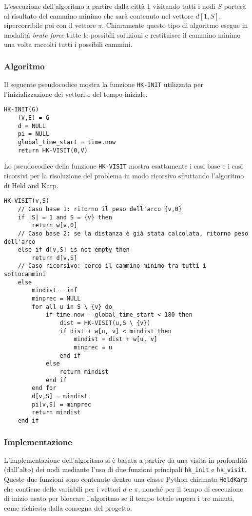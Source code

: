L'esecuzione dell'algoritmo a partire dalla città \(1\) visitando tutti i nodi \(S\) porterà al risultato del cammino minimo che sarà contenuto nel vettore \(d[1, S]\), ripercorribile poi con il vettore \(\pi\). Chiaramente questo tipo di algoritmo esegue in modalità \textit{brute force} tutte le possibili soluzioni e restituisce il cammino minimo una volta raccolti tutti i possibili cammini.

\subsubsection{Algoritmo}

Il seguente pseudocodice mostra la funzione \texttt{HK-INIT} utilizzata per l'inizializzazione dei vettori e del tempo iniziale. 
\begin{verbatim}
HK-INIT(G)
    (V,E) = G
    d = NULL
    pi = NULL
    global_time_start = time.now
    return HK-VISIT(0,V)
\end{verbatim}    

Lo pseudocodice della funzione \texttt{HK-VISIT} mostra esattamente i casi base e i casi ricorsivi per la risoluzione del problema in modo ricorsivo sfruttando l'algoritmo di Held and Karp.
\begin{verbatim}
HK-VISIT(v,S)
    // Caso base 1: ritorno il peso dell'arco {v,0}
    if |S| = 1 and S = {v} then 
        return w[v,0]
    // Caso base 2: se la distanza è già stata calcolata, ritorno peso dell'arco
    else if d[v,S] is not empty then 
        return d[v,S]
    // Caso ricorsivo: cerco il cammino minimo tra tutti i sottocammini
    else
        mindist = inf
        minprec = NULL
        for all u in S \ {v} do
            if time.now - global_time_start < 180 then
                dist = HK-VISIT(u,S \ {v})
                if dist + w[u, v] < mindist then
                    mindist = dist + w[u, v]
                    minprec = u
                end if
            else
                return mindist
            end if
        end for
        d[v,S] = mindist
        pi[v,S] = minprec
        return mindist
    end if
\end{verbatim}


\subsubsection{Implementazione}

L'implementazione dell'algoritmo si è basata a partire da una visita in profondità (dall'alto) dei nodi mediante l'uso di due funzioni principali \texttt{hk\_init} e \texttt{hk\_visit}. Queste due funzioni sono contenute dentro una classe Python chiamata \texttt{HeldKarp} che contiene delle variabili per i vettori \(d\) e \(\pi\), nonché per il tempo di esecuzione di inizio usato per bloccare l'algoritmo se il tempo totale supera i tre minuti, come richiesto dalla consegna del progetto.

